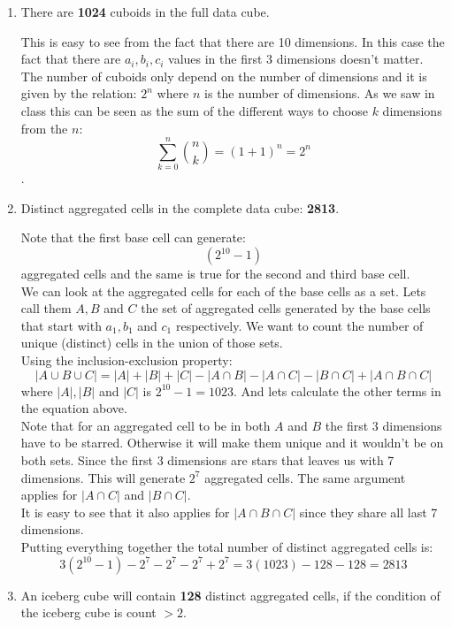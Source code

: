 \documentclass[11pt]{article}
\begin{document}
\begin{enumerate}[label=\alph*.]

\item There are \textbf{1024} cuboids in the full data cube.

This is easy to see from the fact that there are 10 dimensions. In this case the fact that there are $a_i, b_i, c_i$ values in the first 3 dimensions doesn't matter. The number of cuboids only depend on the number of dimensions and it is given by the relation: $2^n$
where $n$ is the number of dimensions. As we saw in class this can be seen as the sum of the different ways to choose $k$ dimensions from the $n$:
\[ \sum_{k = 0}^{n} \binom{n}{k} = (1 + 1)^n = 2^n\].


\item Distinct aggregated cells in the complete data cube: \textbf{2813}. 

Note that the first base cell can generate:
\[(2^{10} - 1)\]
aggregated cells and the same is true for the second and third base cell.\\
We can look at the aggregated cells for each of the base cells as a set. Lets call them $A, B$ and $C$ the set of aggregated cells generated by the base cells that start with $a_1, b_1$ and $c_1$ respectively. We want to count the number of unique (distinct) cells in the union of those sets.\\
Using the inclusion-exclusion property:
\[ |A \cup B \cup C| = |A| + |B| + |C| - |A \cap B| - |A \cap C| - |B \cap C| + |A \cap B \cap C|\]
where $|A|, |B|$ and $|C|$ is $2^{10} - 1 = 1023$. And lets calculate the other terms in the equation above.\\
Note that for an aggregated cell to be in both $A$ and $B$ the first 3 dimensions have to be starred. Otherwise it will make them unique and it wouldn't be on both sets. Since the first 3 dimensions are stars that leaves us with 7 dimensions. This will generate $2^7$ aggregated cells. The same argument applies for $|A \cap C|$ and $|B \cap C|$.\\
It is easy to see that it also applies for $|A \cap B \cap C|$ since they share all last 7 dimensions.\\

Putting everything together the total number of distinct aggregated cells is:
\[ 3(2^{10} - 1) - 2^7 - 2^7 - 2^7 + 2^7 = 3(1023) - 128 - 128 = 2813 \]


\item An iceberg cube will contain \textbf{128} distinct aggregated cells, if the condition of the iceberg cube is count $> 2$.


\end{enumerate}
\end{document}
